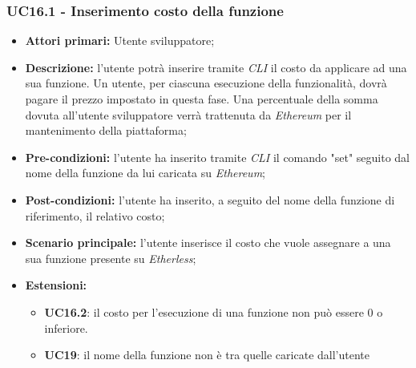\subsubsection{UC16.1 - Inserimento costo della funzione}
\begin{itemize}
	\item \textbf{Attori primari:} Utente sviluppatore;
	\item \textbf{Descrizione:} l'utente potrà inserire tramite \textit{CLI\glo} il costo da applicare ad una sua funzione. Un utente, per ciascuna esecuzione della funzionalità, dovrà pagare il prezzo impostato in questa fase. Una percentuale della somma dovuta all'utente sviluppatore verrà trattenuta da \textit{Ethereum\glo} per il mantenimento della piattaforma;
	\item \textbf{Pre-condizioni:} l'utente ha inserito tramite \textit{CLI\glo} il comando "set" seguito dal nome della funzione da lui caricata su \textit{Ethereum\glos};
	\item \textbf{Post-condizioni:} l'utente ha inserito, a seguito del nome della funzione di riferimento, il relativo costo;
	\item \textbf{Scenario principale:} l'utente inserisce il costo che vuole assegnare a una sua funzione presente su \textit{Etherless};
	\item \textbf{Estensioni:}
	\begin{itemize}
		\item \textbf{UC16.2}: il costo per l'esecuzione di una funzione non può essere 0 o inferiore.
		\item \textbf{UC19}: il nome della funzione non è tra quelle caricate dall'utente
	\end{itemize}
\end{itemize}
